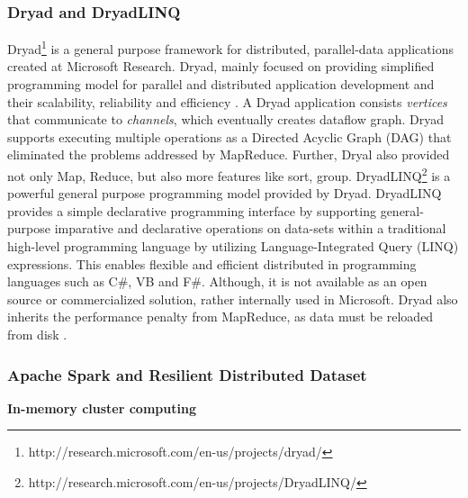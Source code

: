 \subsubsection{Dryad and DryadLINQ}
Dryad\footnote{http://research.microsoft.com/en-us/projects/dryad/} is a general purpose framework for distributed, parallel-data applications created at Microsoft Research. Dryad, mainly focused on providing simplified programming model for parallel and distributed application development and their scalability, reliability and efficiency \cite{DRYAD}. A Dryad application consists \textit{vertices} that communicate to \textit{channels}, which eventually creates dataflow graph. Dryad supports executing multiple operations as a Directed Acyclic Graph (DAG) that eliminated the problems addressed by MapReduce. Further, Dryal also provided not only Map, Reduce, but also more features like sort, group. DryadLINQ\footnote{http://research.microsoft.com/en-us/projects/DryadLINQ/} is a powerful general purpose programming model provided by Dryad. DryadLINQ provides a simple declarative programming interface by supporting general-purpose imparative and declarative operations on data-sets within a traditional high-level programming language \cite{DryadLINQ} by utilizing Language-Integrated Query (LINQ) expressions. This enables flexible and efficient distributed in programming languages such as C\#, VB and F\#. Although, it is not available as an open source or commercialized solution, rather internally used in Microsoft. Dryad also inherits the performance penalty from MapReduce, as data must be reloaded from disk \cite{Spark}.
\subsubsection{Apache Spark and Resilient Distributed Dataset}
\label{sec:spark}

\textbf{In-memory cluster computing} 

